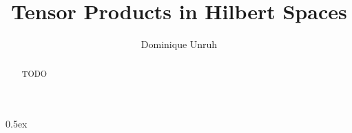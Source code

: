 \documentclass[11pt,a4paper]{article}
\begin{document}
\title{Tensor Products in Hilbert Spaces}
\author{Dominique Unruh}
\maketitle

\begin{abstract}
TODO
\end{abstract}

\tableofcontents

\parindent 0pt\parskip 0.5ex





\end{document}
